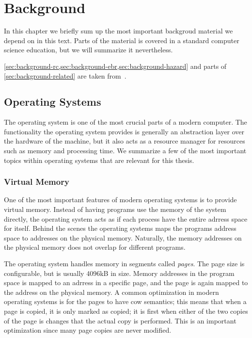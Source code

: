 \chapter{Background\label{ch:background}}

In this chapter we briefly sum up the most important backgroud material we depend on in this text.
Parts of the material is covered in a standard computer science education, but we will summarize it
nevertheless.


\cref{sec:background-rc,sec:background-ebr,sec:background-hazard} and parts of
\cref{sec:background-related} are taken from~\cite{semester}.

\clearpage


\section{Operating Systems}

The operating system is one of the most crucial parts of a modern computer.  The functionality the
operating system provides is generally an abstraction layer over the hardware of the machine, but
it also acts as a resource manager for resources such as memory and processing time. We summarize a
few of the most important topics within operating systems that are relevant for this thesis.


\subsection{Virtual Memory\label{sec:background-virtual-memory}}

One of the most important features of modern operating systems is to provide virtual memory.
Instead of having programs use the memory of the system directly, the operating system acts as if
each process have the entire adrress space for itself. Behind the scenes the operating systems maps
the programs address space to addresses on the physical memory. Naturally, the memory addresses on
the physical memory does not overlap for different programs.

The operating system handles memory in segments called \emph{pages}. The page size is configurable,
but is usually 4096kB in size. Memory addresses in the program space is mapped to an adrress in a
specific page, and the page is again mapped to the address on the physical memory.
A common optimization in modern operating systems is for the pages to have \gls{cow} semantics;
this means that when a page is copied, it is only marked as copied; it is first when either of the
two copies of the page is changes that the actual copy is performed. This is an important
optimization since many page copies are never modified.


